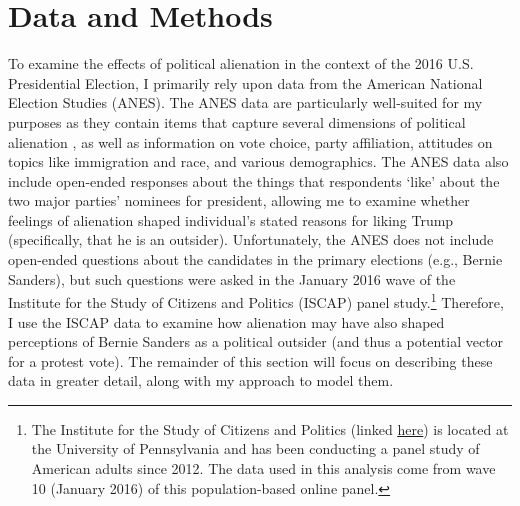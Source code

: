 \documentclass[12pt]{article}
\begin{document}
\section{Data and Methods}\label{sec:datamethods}
To examine the effects of political alienation in the context of the 2016 U.S. Presidential Election, I primarily rely upon data from the American National Election Studies (ANES). The ANES data are particularly well-suited for my purposes as they contain items that capture several dimensions of political alienation \parencite{mason1985}, as well as information on vote choice, party affiliation, attitudes on topics like immigration and race, and various demographics. The ANES data also include open-ended responses about the things that respondents `like' about the two major parties' nominees for president, allowing me to examine whether feelings of alienation shaped individual's stated reasons for liking Trump (specifically, that he is an outsider). Unfortunately, the ANES does not include open-ended questions about the candidates in the primary elections (e.g., Bernie Sanders), but such questions were asked in the January 2016 wave of the Institute for the Study of Citizens and Politics (ISCAP) panel study.\footnote{The Institute for the Study of Citizens and Politics (linked \href{https://www.asc.upenn.edu/research/centers/institute-for-the-study-of-citizens-and-politics}{\underline{here}}) is located at the University of Pennsylvania and has been conducting a panel study of American adults since 2012. The data used in this analysis come from wave 10 (January 2016) of this population-based online panel.} Therefore, I use the ISCAP data to examine how alienation may have also shaped perceptions of Bernie Sanders as a political outsider (and thus a potential vector for a protest vote). The remainder of this section will focus on describing these data in greater detail, along with my approach to model them.  

\end{document}
